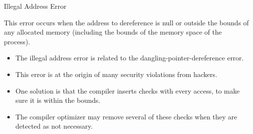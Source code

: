 \begin{bibunit}[apalike]
\begin{frame}{Illegal Address Error}
	\begin{definition}
		This error occurs when the address to dereference is null or outside the bounds of any allocated memory (including the bounds of the memory space of the process).
	\end{definition}
	\vfill
	\begin{itemize}
	\item The illegal address error is related to the dangling-pointer-dereference error.
	\item This error is at the origin of many security violations from hackers.
	\item One solution is that the compiler inserts checks with every access, to make sure it is within the bounds.
	\item The compiler optimizer may remove several of these checks when they are detected as not necessary.
	\end{itemize}
\end{frame}


\end{bibunit}
